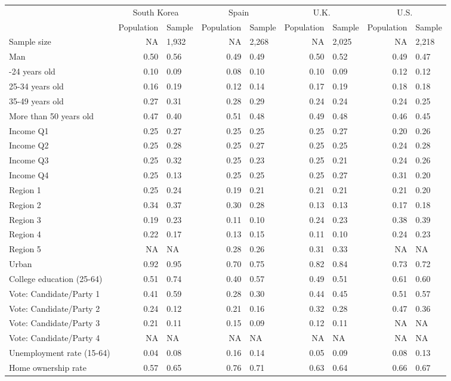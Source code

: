 
\begin{tabular}[t]{lrlrlrlrl}
\toprule
\multicolumn{1}{c}{} & \multicolumn{2}{c}{South Korea} & \multicolumn{2}{c}{Spain} & \multicolumn{2}{c}{U.K.} & \multicolumn{2}{c}{U.S.} \\
\cmidrule(l{3pt}r{3pt}){2-3} \cmidrule(l{3pt}r{3pt}){4-5} \cmidrule(l{3pt}r{3pt}){6-7} \cmidrule(l{3pt}r{3pt}){8-9}
  & Population & Sample & Population & Sample & Population & Sample & Population & Sample\\
\midrule
Sample size & NA & 1,932 & NA & 2,268 & NA & 2,025 & NA & 2,218\\
\midrule
Man & 0.50 & 0.56 & 0.49 & 0.49 & 0.50 & 0.52 & 0.49 & 0.47\\
\addlinespace
18-24 years old & 0.10 & 0.09 & 0.08 & 0.10 & 0.10 & 0.09 & 0.12 & 0.12\\
25-34 years old & 0.16 & 0.19 & 0.12 & 0.14 & 0.17 & 0.19 & 0.18 & 0.18\\
35-49 years old & 0.27 & 0.31 & 0.28 & 0.29 & 0.24 & 0.24 & 0.24 & 0.25\\
More than 50 years old & 0.47 & 0.40 & 0.51 & 0.48 & 0.49 & 0.48 & 0.46 & 0.45\\
\addlinespace
Income Q1 & 0.25 & 0.27 & 0.25 & 0.25 & 0.25 & 0.27 & 0.20 & 0.26\\
Income Q2 & 0.25 & 0.28 & 0.25 & 0.27 & 0.25 & 0.25 & 0.24 & 0.28\\
Income Q3 & 0.25 & 0.32 & 0.25 & 0.23 & 0.25 & 0.21 & 0.24 & 0.26\\
Income Q4 & 0.25 & 0.13 & 0.25 & 0.25 & 0.25 & 0.27 & 0.31 & 0.20\\
\addlinespace
Region 1 & 0.25 & 0.24 & 0.19 & 0.21 & 0.21 & 0.21 & 0.21 & 0.20\\
Region 2 & 0.34 & 0.37 & 0.30 & 0.28 & 0.13 & 0.13 & 0.17 & 0.18\\
Region 3 & 0.19 & 0.23 & 0.11 & 0.10 & 0.24 & 0.23 & 0.38 & 0.39\\
Region 4 & 0.22 & 0.17 & 0.13 & 0.15 & 0.11 & 0.10 & 0.24 & 0.23\\
Region 5 & NA & NA & 0.28 & 0.26 & 0.31 & 0.33 & NA & NA\\
\addlinespace
Urban & 0.92 & 0.95 & 0.70 & 0.75 & 0.82 & 0.84 & 0.73 & 0.72\\
\addlinespace
College education (25-64) & 0.51 & 0.74 & 0.40 & 0.57 & 0.49 & 0.51 & 0.61 & 0.60\\
\addlinespace
Vote: Candidate/Party 1 & 0.41 & 0.59 & 0.28 & 0.30 & 0.44 & 0.45 & 0.51 & 0.57\\
Vote: Candidate/Party 2 & 0.24 & 0.12 & 0.21 & 0.16 & 0.32 & 0.28 & 0.47 & 0.36\\
Vote: Candidate/Party 3 & 0.21 & 0.11 & 0.15 & 0.09 & 0.12 & 0.11 & NA & NA\\
Vote: Candidate/Party 4 & NA & NA & NA & NA & NA & NA & NA & NA\\
\addlinespace
Unemployment rate (15-64) & 0.04 & 0.08 & 0.16 & 0.14 & 0.05 & 0.09 & 0.08 & 0.13\\
\addlinespace
Home ownership rate & 0.57 & 0.65 & 0.76 & 0.71 & 0.63 & 0.64 & 0.66 & 0.67\\
\bottomrule
\end{tabular}